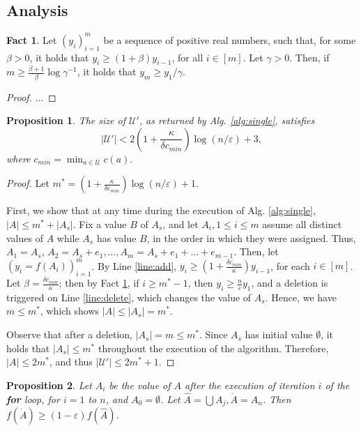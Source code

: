\documentclass{article}
\newtheorem{proposition}{Proposition}
\theoremstyle{definition}
\newtheorem{fact}{Fact}
\newcommand{\uni}{\mathcal{U}}
\newcommand{\epsi}{\varepsilon}
\begin{document}
\subsection{Analysis}
\begin{fact} \label{fact:1}
  Let $(y_i)_{i=1}^m$ be a sequence of positive real numbers, such that, for some $\beta > 0$, it holds that $y_i \ge (1 + \beta)y_{i-1}$, for all $i \in [m]$. Let $\gamma > 0$. Then, if $m \ge \frac{\beta + 1}{\beta}\log \gamma^{-1} $, it holds that $y_m \ge y_1 / \gamma$.
\end{fact}
\begin{proof} ...
\end{proof}
\begin{proposition} \label{prop:uprime-size}
  The size of $\uni'$, as returned by Alg. \ref{alg:single}, satisfies
  $$|\uni'| < 2 \left( 1 + \frac{\kappa }{\delta c_{min} } \right) \log ( n / \epsi ) + 3,$$
  where $c_{min} = \min_{a \in \uni } c(a).$
\end{proposition}
\begin{proof}
  Let $m^* = \left( 1 + \frac{\kappa }{\delta c_{min} } \right) \log ( n / \epsi ) + 1.$
  
  First, we show that at any time during the execution of Alg. \ref{alg:single}, $|A| \le m^* + |A_s|$.
  Fix a value $B$ of $A_s$, and let $A_i, 1 \le i \le m$ assume all distinct values of $A$ while $A_s$
  has value $B$, in the order in which they were assigned. Thus, $A_1 = A_s$, $A_2 = A_s + e_1, \ldots, A_m = A_s + e_1 + \ldots + e_{m-1}$.
  Then, let $(y_i = f(A_i))_{i=1}^m$. By Line \ref{line:add}, $y_i \ge \left( 1 + \frac{\delta c_{min}}{\kappa } \right) y_{i-1}$, for each $i \in [m]$. Let $\beta = \frac{\delta c_{min}}{\kappa }$; then by Fact \ref{fact:1}, if $i \ge m^* - 1$, then $y_i \ge \frac{n}{\epsi} y_1$, and a deletion is triggered on Line \ref{line:delete}, which changes the value of $A_s$. Hence, we have $m \le m^*$, which shows $|A| \le |A_s| = m^*$.

  Observe that after a deletion, $|A_s| = m \le m^*$. Since $A_s$ has initial value $\emptyset$, it holds that $|A_s| \le m^*$ throughout the execution of the algorithm. Therefore, $|A| \le 2m^*$, and thus $|\uni'| \le 2m^* +1$. 
\end{proof}
\begin{proposition} \label{prop:ahat-adot}
  Let $A_i$ be the value of $A$ after the execution of iteration $i$ of the \textbf{for} loop,
  for $i = 1$ to $n$, and $A_0 = \emptyset$. 
  Let $\hat A = \bigcup A_j, \dot A = A_n$. Then $f( \dot A ) \ge (1 - \epsi )f( \hat A)$. 
\end{proposition}
\end{document}
